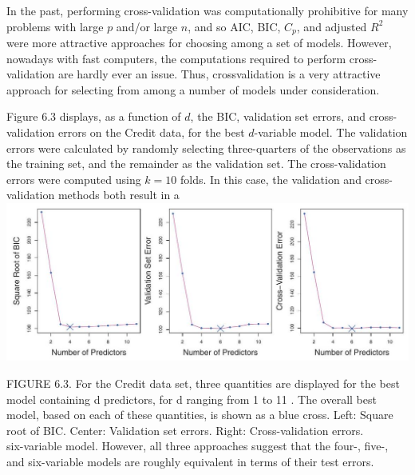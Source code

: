 \documentclass[10pt]{article}
\begin{document}
In the past, performing cross-validation was computationally prohibitive for many problems with large $p$ and/or large $n$, and so AIC, BIC, $C_{p}$, and adjusted $R^{2}$ were more attractive approaches for choosing among a set of models. However, nowadays with fast computers, the computations required to perform cross-validation are hardly ever an issue. Thus, crossvalidation is a very attractive approach for selecting from among a number of models under consideration.

Figure 6.3 displays, as a function of $d$, the BIC, validation set errors, and cross-validation errors on the Credit data, for the best $d$-variable model. The validation errors were calculated by randomly selecting three-quarters of the observations as the training set, and the remainder as the validation set. The cross-validation errors were computed using $k=10$ folds. In this case, the validation and cross-validation methods both result in a\\
\includegraphics[max width=\textwidth, center]{2025_05_05_efe77898333945044de4g-229}

FIGURE 6.3. For the Credit data set, three quantities are displayed for the best model containing d predictors, for d ranging from 1 to 11 . The overall best model, based on each of these quantities, is shown as a blue cross. Left: Square root of BIC. Center: Validation set errors. Right: Cross-validation errors.\\
six-variable model. However, all three approaches suggest that the four-, five-, and six-variable models are roughly equivalent in terms of their test errors.
\end{document}
